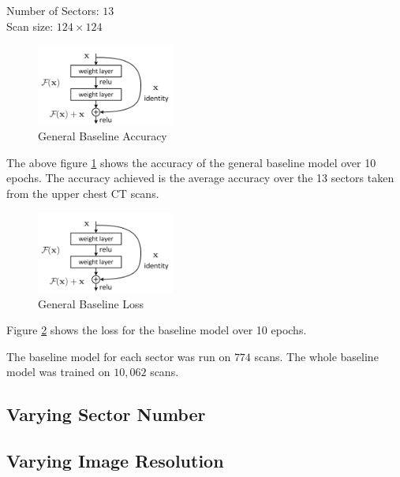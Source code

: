 \documentclass[10pt,twocolumn,letterpaper]{article}
\begin{document}
      \begin{center}
         Number of Sectors: $13$ \\
         Scan size: $124 \times 124$
      \end{center}
    
      \begin{figure}
         \centering
         \includegraphics[width=0.4\textwidth]{./images/residual.png}
         \caption{General Baseline Accuracy}
         \label{fig:experiments-general-acc}
      \end{figure}
    
      The above figure \ref{fig:experiments-general-acc} shows the accuracy of the general baseline model over 10 epochs.
      The accuracy achieved is the average accuracy over the 13 sectors taken from the upper chest CT scans.
    
      \begin{figure}
         \centering
         \includegraphics[width=0.4\textwidth]{./images/residual.png}
         \caption{General Baseline Loss}
         \label{fig:experiments-general-loss}
      \end{figure}
    
      Figure \ref{fig:experiments-general-loss} shows the loss for the baseline model over 10 epochs.
    
      The baseline model for each sector was run on $774$ scans. The whole baseline model was trained on $10,062$ scans.
   \subsection{Varying Sector Number} \label{sec:experiments-sector}


   \subsection{Varying Image Resolution} \label{sec:experiements-res}
\end{document}
